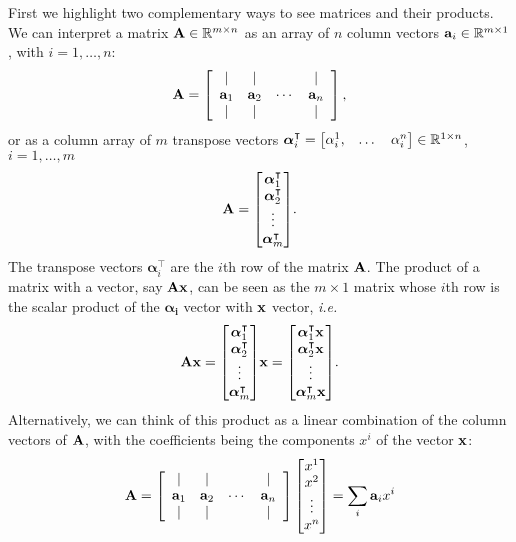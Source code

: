 \documentclass{article}
\begin{document}
First we highlight two complementary ways to see matrices and their products. We can interpret a matrix $\vb{A}\in \mathbb{R}^{m\times n}$ as an array of $n$ column vectors $\vb{a}_i\in\mathbb{R}^{m\times 1}$,  with $i=1,\dots,n$:
\begin{equation}
   \vb{A}=\left[\begin{array}{cccc}
    \mid & \mid & & \mid \\
    \vb{a}_{1} & \vb{a}_{2} & \cdots & \vb{a}_{n} \\
    \mid & \mid & & \mid
    \end{array}\right],
\end{equation}
or as a column array of $m$ transpose vectors $\boldsymbol{\alpha}_i^\intercal=\mqty[\alpha_i^1, & \dots & \alpha_i^n]\in\mathbb{R}^{1\times n}$, $i=1,\dots, m$
\begin{equation}
    \vb{A} = \mqty[\boldsymbol{\alpha}_1^\intercal \\ \boldsymbol{\alpha}_2^\intercal \\ \vdots \\ \boldsymbol{\alpha}_m^\intercal].
\end{equation}
The transpose vectors $\boldsymbol{\alpha}_i^\intercal$ are the $i$th row of the matrix $\vb{A}$.
The product of a matrix with a vector, say $\vb{Ax}$,  can be seen as the $m\times 1$ matrix whose $i$th row is the scalar product of the $\boldsymbol{\alpha_i}$ vector with $\vb{x}$ vector, \textit{i.e.} 
\begin{equation}
    \vb{Ax} = \mqty[\boldsymbol{\alpha}_1^\intercal \\ \boldsymbol{\alpha}_2^\intercal \\ \vdots \\ \boldsymbol{\alpha}_m^\intercal] \vb{ x} = \mqty[\boldsymbol{\alpha}_1^\intercal \vb{x}\\ \boldsymbol{\alpha}_2^\intercal \vb{x}\\ \vdots \\ \boldsymbol{\alpha}_m^\intercal\vb{x}].
\end{equation}
Alternatively, we can think of this product as a linear combination of the column vectors of $\vb{A}$, with the coefficients being the components $x^i$ of the vector $\vb{x}$:
\begin{equation}
   \vb{A}=\left[\begin{array}{cccc}
    \mid & \mid & & \mid \\
    \vb{a}_{1} & \vb{a}_{2} & \cdots & \vb{a}_{n} \\
    \mid & \mid & & \mid
    \end{array}\right]\mqty[x^1 \\ x^2 \\ \vdots \\ x^n] = \sum_i \vb{a}_i x^i
\end{equation}
\end{document}
